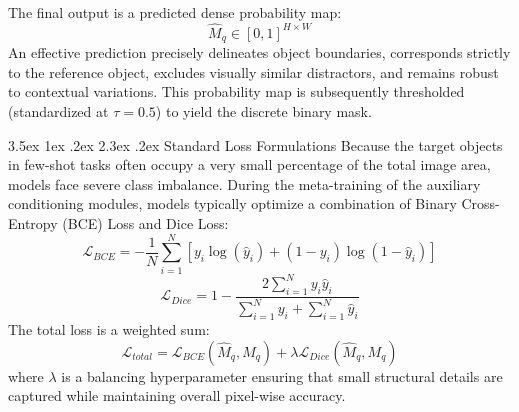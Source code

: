 \documentclass[journal,12pt,onecolumn,draftclsnofoot]{IEEEtran}
\makeatletter
\renewcommand{\section}{\@startsection{section}{1}{\z@}%
    {3.5ex \@plus 1ex \@minus .2ex}%
    {2.3ex \@plus.2ex}%
    {\normalfont\Large\bfseries}}
\makeatother
\begin{document}
The final output is a predicted dense probability map:
\begin{equation}
    \hat{M}_q \in [0, 1]^{H \times W}
\end{equation}
An effective prediction precisely delineates object boundaries, corresponds strictly to the reference object, excludes visually similar distractors, and remains robust to contextual variations. This probability map is subsequently thresholded (standardized at $\tau = 0.5$) to yield the discrete binary mask.

\section{Standard Loss Formulations}
Because the target objects in few-shot tasks often occupy a very small percentage of the total image area, models face severe class imbalance. During the meta-training of the auxiliary conditioning modules, models typically optimize a combination of Binary Cross-Entropy (BCE) Loss and Dice Loss:
\begin{equation}
    \mathcal{L}_{BCE} = -\frac{1}{N} \sum_{i=1}^N \left[ y_i \log(\hat{y}_i) + (1 - y_i) \log(1 - \hat{y}_i) \right]
\end{equation}
\begin{equation}
    \mathcal{L}_{Dice} = 1 - \frac{2 \sum_{i=1}^N y_i \hat{y}_i}{\sum_{i=1}^N y_i + \sum_{i=1}^N \hat{y}_i}
\end{equation}
The total loss is a weighted sum:
\begin{equation}
    \mathcal{L}_{total} = \mathcal{L}_{BCE}(\hat{M}_q, M_q) + \lambda \mathcal{L}_{Dice}(\hat{M}_q, M_q)
\end{equation}
where $\lambda$ is a balancing hyperparameter ensuring that small structural details are captured while maintaining overall pixel-wise accuracy.
\end{document}
